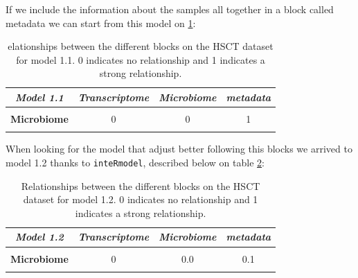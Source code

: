 \documentclass[
  12pt,
  a4paper,
  twoside,
  openright]{book}
\begin{document}
If we include the information about the samples all together in a block called metadata we can start from this model on \ref{tab:hsct-model1-1}:

\begin{table}[H]

\caption[Model 1.1 the of HSCT dataset.]{\label{tab:hsct-model1-1}elationships between the different blocks on the HSCT dataset for model 1.1. 0 indicates no relationship and 1 indicates a strong relationship.}
\centering
\begin{tabular}[t]{|>{}c|c|c|>{}c|}
\hline
\em{\textbf{Model 1.1}} & \em{\textbf{Transcriptome}} & \em{\textbf{Microbiome}} & \em{\textbf{metadata}}\\
\hline
\textbf{\cellcolor{gray!6}{Transcriptome}} & \cellcolor{gray!6}{0} & \cellcolor{gray!6}{0} & \cellcolor{gray!6}{1}\\
\hline
\textbf{Microbiome} & 0 & 0 & 1\\
\hline
\textbf{\cellcolor{gray!6}{metadata}} & \cellcolor{gray!6}{1} & \cellcolor{gray!6}{1} & \cellcolor{gray!6}{0}\\
\hline
\end{tabular}
\end{table}

When looking for the model that adjust better following this blocks we arrived to model 1.2 thanks to \texttt{inteRmodel}, described below on table \ref{tab:hsct-model1-2}:

\begin{table}[H]

\caption[Model 1.2 of HSCT dataset.]{\label{tab:hsct-model1-2}Relationships between the different blocks on the HSCT dataset for model 1.2. 0 indicates no relationship and 1 indicates a strong relationship.}
\centering
\begin{tabular}[t]{|>{}c|c|c|>{}c|}
\hline
\em{\textbf{Model 1.2}} & \em{\textbf{Transcriptome}} & \em{\textbf{Microbiome}} & \em{\textbf{metadata}}\\
\hline
\textbf{\cellcolor{gray!6}{Transcriptome}} & \cellcolor{gray!6}{0} & \cellcolor{gray!6}{0.0} & \cellcolor{gray!6}{1.0}\\
\hline
\textbf{Microbiome} & 0 & 0.0 & 0.1\\
\hline
\textbf{\cellcolor{gray!6}{metadata}} & \cellcolor{gray!6}{1} & \cellcolor{gray!6}{0.1} & \cellcolor{gray!6}{0.0}\\
\hline
\end{tabular}
\end{table}
\end{document}
